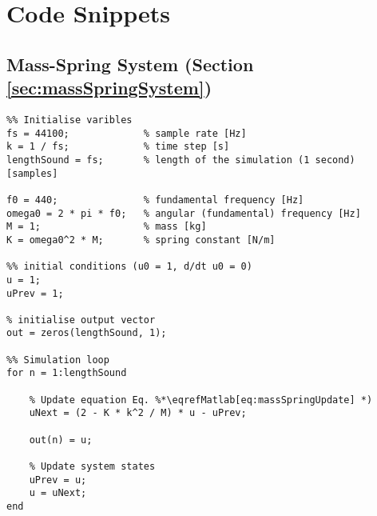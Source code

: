 \chapter{Code Snippets}
\renewcommand\thesection{\thechapter.\arabic{section}}

\section{Mass-Spring System (Section \ref{sec:massSpringSystem})}\label{app:massSpringCode}

\setlstMAT
\begin{lstlisting}
%% Initialise varibles
fs = 44100;             % sample rate [Hz]
k = 1 / fs;             % time step [s]
lengthSound = fs;       % length of the simulation (1 second) [samples]

f0 = 440;               % fundamental frequency [Hz]
omega0 = 2 * pi * f0;   % angular (fundamental) frequency [Hz]
M = 1;                  % mass [kg]
K = omega0^2 * M;       % spring constant [N/m]

%% initial conditions (u0 = 1, d/dt u0 = 0)
u = 1;                  
uPrev = 1;

% initialise output vector
out = zeros(lengthSound, 1);

%% Simulation loop
for n = 1:lengthSound
    
    % Update equation Eq. %*\eqrefMatlab[eq:massSpringUpdate] *)
    uNext = (2 - K * k^2 / M) * u - uPrev; 
    
    out(n) = u;
    
    % Update system states
    uPrev = u;
    u = uNext;
end    
\end{lstlisting}